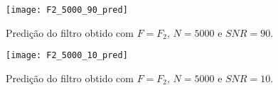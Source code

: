 \begin{figure}[h]
	\centering
	\texttt{[image: F2\_5000\_90\_pred]}
	\caption{Predição do filtro obtido com $ F=F_2 $, $ N=5000 $ e $ SNR=90 $.}
	\label{fig:F2_5000_90_pred}
\end{figure}  

\begin{figure}[h]
	\centering
	\texttt{[image: F2\_5000\_10\_pred]}
	\caption{Predição do filtro obtido com $ F=F_2 $, $ N=5000 $ e $ SNR=10 $.}
	\label{fig:F2_5000_10_pred}
\end{figure}

